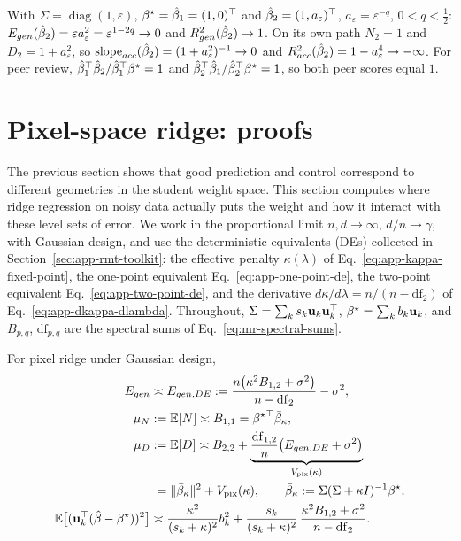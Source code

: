 \begin{example}
With $\Sigma=\operatorname{diag}(1,\varepsilon)$, ${\beta^{\star}}=\hat{\beta}_1=(1,0)^\top$
and $\hat{\beta}_2=(1,a_\varepsilon)^\top$, $a_\varepsilon=\varepsilon^{-q}$,
$0<q<\tfrac12$: $E_{gen}(\hat{\beta}_2)=\varepsilon a_\varepsilon^2=\varepsilon^{1-2q}\to0$
and $R^2_{gen}(\hat{\beta}_2)\to1$.  On its own path $N_2=1$ and
$D_2=1+a_\varepsilon^2$, so $\mathrm{slope}_{acc}(\hat{\beta}_2)=(1+a_\varepsilon^2)^{-1}\to0$
and $R^2_{acc}(\hat{\beta}_2)=1-a_\varepsilon^4\to-\infty$.  For peer review,
${\hat{\beta}_1}^\top\hat{\beta}_2/{\hat{\beta}_1}^\top{\beta^{\star}}=1$ and
${\hat{\beta}_2}^\top\hat{\beta}_1/{\hat{\beta}_2}^\top{\beta^{\star}}=1$, so both peer scores equal $1$.
\end{example}

\section{Pixel-space ridge: proofs}
\label{sec:app-pixel-ridge}

The previous section shows that good prediction and control correspond to different geometries in the student weight space. 
This section computes where ridge regression on
noisy data actually puts the weight and how it interact with these level sets of error.  
We work in the proportional limit $n,d\to\infty$, $d/n\to\gamma$, with Gaussian design, and use the
deterministic equivalents (DEs) collected in Section~\ref{sec:app-rmt-toolkit}:
the effective penalty $\kappa(\lambda)$ of Eq.~\ref{eq:app-kappa-fixed-point},
the one-point equivalent Eq.~\ref{eq:app-one-point-de}, the two-point
equivalent Eq.~\ref{eq:app-two-point-de}, and the derivative
$d\kappa/d\lambda=n/(n-\mathrm{df}_2)$ of Eq.~\ref{eq:app-dkappa-dlambda}.
Throughout, $\Sigma=\sum_ks_k{\mathbf{u}}_k{\mathbf{u}}_k^\top$, ${\beta^{\star}}=\sum_kb_k{\mathbf{u}}_k$,
and $B_{p,q}$, $\mathrm{df}_{p,q}$ are the spectral sums of
Eq.~\ref{eq:mr-spectral-sums}.

\begin{prop}
\label{prop:app-pixel-ridge-de}
For pixel ridge under Gaussian design,
\begin{align}
E_{gen}&\asymp E_{gen,DE}:=\frac{n\big(\kappa^2B_{1,2}+\sigma^2\big)}{n-\mathrm{df}_2}-\sigma^2,
\label{eq:app-pixel-egen-summary}\\
\mu_N&:=\mathbb{E}[N]\asymp B_{1,1}={\beta^{\star}}^\top\bar\beta_\kappa,
\label{eq:app-pixel-N-summary}\\
\mu_D&:=\mathbb{E}[D]\asymp B_{2,2}+\underbrace{\frac{\mathrm{df}_{1,2}}{n}\big(E_{gen,DE}+\sigma^2\big)}_{V_{\rm pix}(\kappa)}
\notag\\
&\phantom{:}=\|\bar\beta_\kappa\|^2+V_{\rm pix}(\kappa),\qquad \bar\beta_\kappa:=\Sigma(\Sigma+\kappa I)^{-1}{\beta^{\star}},
\label{eq:app-pixel-D-summary}\\
\mathbb{E}\big[({\mathbf{u}}_k^\top(\hat{\beta}-{\beta^{\star}}))^2\big]&\asymp
\frac{\kappa^2}{(s_k+\kappa)^2}b_k^2
+\frac{s_k}{(s_k+\kappa)^2}\,\frac{\kappa^2B_{1,2}+\sigma^2}{n-\mathrm{df}_2}.
\label{eq:app-per-pc}
\end{align}
\end{prop}

